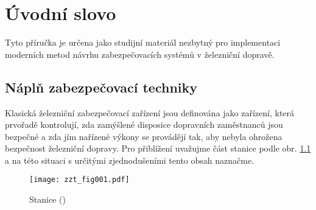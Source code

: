 {
\chapter{Úvodní slovo}\label{bzt:chapI}
\minitoc

  Tyto příručka je určena jako studijní materiál nezbytný pro implementaci moderních 
  metod návrhu zabezpečovacích systémů v železniční dopravě.
   
\section{Náplň zabezpečovací techniky}
  Klasická železniční zabezpečovací zařízení jsou definována jako zařízení, která prvořadě 
  kontrolují, zda zamýšlené disposice dopravních zaměstnanců jsou bezpečné a zda jím nařízené 
  výkony se provádějí tak, aby nebyla ohrožena bezpečnost železniční dopravy. Pro přiblížení 
  uvažujme část stanice podle obr. \ref{zzt:fig001} a na této situaci s určitými zjednodušeními 
  tento obsah naznačme.

  \begin{figure}[ht!] %
    \centering
    \texttt{[image: zzt\_fig001.pdf]}
    \caption{Stanice
             (\cite[s.~5]{Chudacek2005})}
    \label{zzt:fig001}
  \end{figure}
 
}

